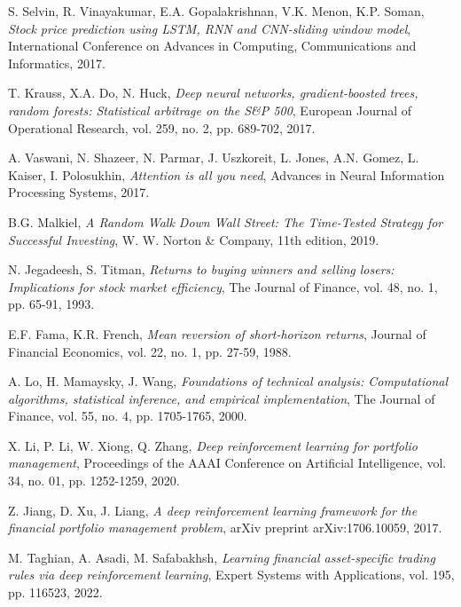 \documentclass[10pt,twocolumn]{article}
\begin{document}
\begin{thebibliography}{35}

S. Selvin, R. Vinayakumar, E.A. Gopalakrishnan, V.K. Menon, K.P. Soman,
\textit{Stock price prediction using LSTM, RNN and CNN-sliding window model},
International Conference on Advances in Computing, Communications and Informatics, 2017.

T. Krauss, X.A. Do, N. Huck,
\textit{Deep neural networks, gradient-boosted trees, random forests: Statistical arbitrage on the S\&P 500},
European Journal of Operational Research, vol. 259, no. 2, pp. 689-702, 2017.

A. Vaswani, N. Shazeer, N. Parmar, J. Uszkoreit, L. Jones, A.N. Gomez, L. Kaiser, I. Polosukhin,
\textit{Attention is all you need},
Advances in Neural Information Processing Systems, 2017.

B.G. Malkiel,
\textit{A Random Walk Down Wall Street: The Time-Tested Strategy for Successful Investing},
W. W. Norton \& Company, 11th edition, 2019.

N. Jegadeesh, S. Titman,
\textit{Returns to buying winners and selling losers: Implications for stock market efficiency},
The Journal of Finance, vol. 48, no. 1, pp. 65-91, 1993.

E.F. Fama, K.R. French,
\textit{Mean reversion of short-horizon returns},
Journal of Financial Economics, vol. 22, no. 1, pp. 27-59, 1988.

A. Lo, H. Mamaysky, J. Wang,
\textit{Foundations of technical analysis: Computational algorithms, statistical inference, and empirical implementation},
The Journal of Finance, vol. 55, no. 4, pp. 1705-1765, 2000.

X. Li, P. Li, W. Xiong, Q. Zhang,
\textit{Deep reinforcement learning for portfolio management},
Proceedings of the AAAI Conference on Artificial Intelligence, vol. 34, no. 01, pp. 1252-1259, 2020.

Z. Jiang, D. Xu, J. Liang,
\textit{A deep reinforcement learning framework for the financial portfolio management problem},
arXiv preprint arXiv:1706.10059, 2017.

M. Taghian, A. Asadi, M. Safabakhsh,
\textit{Learning financial asset-specific trading rules via deep reinforcement learning},
Expert Systems with Applications, vol. 195, pp. 116523, 2022.


\end{thebibliography}
\end{document}
